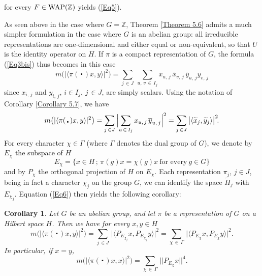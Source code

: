 \documentclass[11pt,english,a4paper]{smfart}
\numberwithin{equation}{section}
\newtheorem{corollary}[theorem]{Corollary}
\theoremstyle{definition}
\begin{document}
for every $F\in \mbox{WAP({\ensuremath{\mathbb Z}})}$ yields (\ref{Eq5}).
\par\smallskip 
As seen above in the case where $G={\ensuremath{\mathbb Z}}$, Theorem \ref{Theorem 5.6} admits a 
much simpler formulation in the case where $G$ is an abelian group: all 
irreducible representations are one-dimensional and either equal or 
non-equivalent, so that $U$ is the identity operator on $H$. If $\pi$ is a compact representation of $G$, the formula 
(\ref{Eq3bis}) thus becomes 
in this case
\[
m\bigl(|{\ensuremath{{\langle {\pi (\,\centerdot\,)x},{y}\rangle}}}|^{2} 
\bigr)=\sum_{j\,\in J}\
\sum_{{{u,\,v}}\,\in\,I_{j}}x_{u,\,j}\,{\overline{{x}}}_{v,\,j}\,{\overline{{y}}}_{u,\,j}
y_{v,\,j}
\]
since $x_{i,\,j}$ and $y_{i,\,j}$, $i\in I_{j}$, ${j\,\in J}$, are simply 
scalars.
Using the notation of Corollary \ref{Corollary 5.7}, we have
\begin{equation}\label{Eq6}
m\bigl(|{\ensuremath{{\langle {\pi (\,\centerdot\,)x},{y}\rangle}}}|^{2} 
\bigr)=\sum_{j\,\in J}\,\Bigl|\sum_{u\,\in\,I_{j}}x_{u,\,j}\,{\overline{{y}}}_{u,\,j}
\Bigr|^{2}= 
\sum_{j\,\in J}\,\bigl|{\ensuremath{{\langle {{\widetilde{{x}}}_{j}},{{\widetilde{{y}}}_{j}}\rangle}}}\bigr|^{2}\!.
\end{equation}
For every character $\chi \in\Gamma $ (where $\Gamma $ denotes the 
dual 
group of $G$), we denote by $E_{\chi }$ the subspace of $H$
\[
E_{\chi }=\{x\in H\,;\,\pi (g)x=\chi (g)x\ \textrm{for every}\ g\in G\}
\]
and by $P_{\chi }$ 
the orthogonal projection of $H$ on $E_{\chi}$.
Each representation $\pi _{j}$, $j\in J$, being in fact a character $\chi 
_{j}$ on the group $G$, we can identify the space ${\widetilde{{H}}}_{j}$ with 
$E_{\chi_{j} }$. Equation (\ref{Eq6}) then yields the following corollary:

\begin{corollary}\label{cor+}
 Let $G$ be an abelian group, and let $\pi$ be a representation of $G$ on a Hilbert space $H$. Then we have for every $x,y\in H$
 \[
m\bigl(|{\ensuremath{{\langle {\pi (\,\centerdot\,)x},{y}\rangle}}}|^{2} 
\bigr)=\sum_{j\,\in J}\,\bigl|{\ensuremath{{\langle {P_{E_{\chi _{j}}}x},{P_{E_{\chi _{j}}}y}\rangle}}}
\bigr|^{2}= 
\sum_{\chi\,\in\,\Gamma }\,\bigl|{\ensuremath{{\langle {P_{E_{\chi}}x},{P_{E_{\chi 
}}y}\rangle}}}\bigr|^{2} \!.
\]
In particular, if $x=y$,
\[
m\bigl(|{\ensuremath{{\langle {\pi (\,\centerdot\,)x},{x}\rangle}}}|^{2} 
\bigr)=\sum_{\chi\,\in\,\Gamma }\,\bigl|\bigl|P_{E_{\chi 
}}x\bigr|\bigr|^{4}\!.
\]
\end{corollary}
\end{document}
